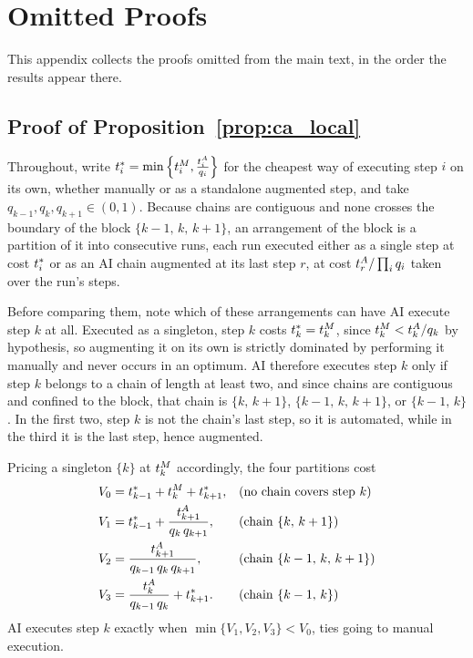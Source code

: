 \section{Omitted Proofs}
\label{app:omitted_proofs}

This appendix collects the proofs omitted from the main text, in the order the results appear there.

\subsection{Proof of Proposition~\ref{prop:ca_local}}
\label{app:ca_local_proof}

Throughout, write $t^*_{i} = \min\left\{t^{M}_{i}, \frac{t^{A}_{i}}{q_i}\right\}$ for the cheapest way of executing step $i$ on its own, whether manually or as a standalone augmented step, and take $q_{k-1}, q_k, q_{k+1} \in (0,1)$.
Because chains are contiguous and none crosses the boundary of the block $\{k-1,\, k,\, k+1\}$, an arrangement of the block is a partition of it into consecutive runs, each run executed either as a single step at cost $t^*_{i}$ or as an AI chain augmented at its last step $r$, at cost $t^{A}_{r}/\prod_i q_i$ taken over the run's steps.

Before comparing them, note which of these arrangements can have AI execute step $k$ at all.
Executed as a singleton, step $k$ costs $t^*_{k} = t^{M}_{k}$, since $t^{M}_{k} < t^{A}_{k}/q_k$ by hypothesis, so augmenting it on its own is strictly dominated by performing it manually and never occurs in an optimum.
AI therefore executes step $k$ only if step $k$ belongs to a chain of length at least two, and since chains are contiguous and confined to the block, that chain is $\{k,\, k+1\}$, $\{k-1,\, k,\, k+1\}$, or $\{k-1,\, k\}$.
In the first two, step $k$ is not the chain's last step, so it is automated, while in the third it is the last step, hence augmented.

Pricing a singleton $\{k\}$ at $t^{M}_{k}$ accordingly, the four partitions cost
\begin{align*}
V_0 &= t^*_{k-1} + t^{M}_{k} + t^*_{k+1}, && \text{(no chain covers step $k$)} \\
V_1 &= t^*_{k-1} + \frac{t^{A}_{k+1}}{q_k\, q_{k+1}}, && \text{(chain $\{k,\, k+1\}$)} \\
V_2 &= \frac{t^{A}_{k+1}}{q_{k-1}\, q_k\, q_{k+1}}, && \text{(chain $\{k-1,\, k,\, k+1\}$)} \\
V_3 &= \frac{t^{A}_{k}}{q_{k-1}\, q_k} + t^*_{k+1}. && \text{(chain $\{k-1,\, k\}$)}
\end{align*}
AI executes step $k$ exactly when $\min\{V_1, V_2, V_3\} < V_0$, ties going to manual execution.

